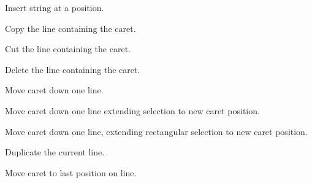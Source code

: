 \label{wxstyledtextctrlinserttextraw}


Insert string at a position.


\label{wxstyledtextctrllinecopy}


Copy the line containing the caret.


\label{wxstyledtextctrllinecut}


Cut the line containing the caret.


\label{wxstyledtextctrllinedelete}


Delete the line containing the caret.


\label{wxstyledtextctrllinedown}


Move caret down one line.


\label{wxstyledtextctrllinedownextend}


Move caret down one line extending selection to new caret position.


\label{wxstyledtextctrllinedownrectextend}


Move caret down one line, extending rectangular selection to new caret position.


\label{wxstyledtextctrllineduplicate}


Duplicate the current line.


\label{wxstyledtextctrllineend}


Move caret to last position on line.


\label{wxstyledtextctrllineenddisplay}

